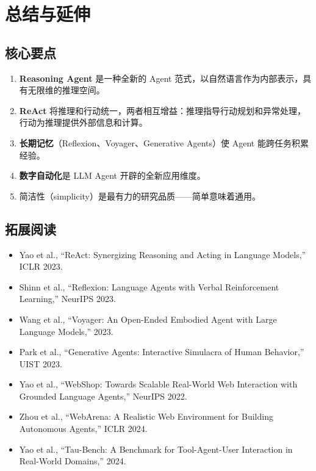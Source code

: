\section{总结与延伸}

\subsection{核心要点}

\begin{enumerate}
    \item \textbf{Reasoning Agent} 是一种全新的 Agent 范式，以自然语言作为内部表示，具有无限维的推理空间。
    \item \textbf{ReAct} 将推理和行动统一，两者相互增益：推理指导行动规划和异常处理，行动为推理提供外部信息和计算。
    \item \textbf{长期记忆}（Reflexion、Voyager、Generative Agents）使 Agent 能跨任务积累经验。
    \item \textbf{数字自动化}是 LLM Agent 开辟的全新应用维度。
    \item 简洁性（simplicity）是最有力的研究品质——简单意味着通用。
\end{enumerate}

\subsection{拓展阅读}

\begin{itemize}
    \item Yao et al., ``ReAct: Synergizing Reasoning and Acting in Language Models,'' ICLR 2023.
    \item Shinn et al., ``Reflexion: Language Agents with Verbal Reinforcement Learning,'' NeurIPS 2023.
    \item Wang et al., ``Voyager: An Open-Ended Embodied Agent with Large Language Models,'' 2023.
    \item Park et al., ``Generative Agents: Interactive Simulacra of Human Behavior,'' UIST 2023.
    \item Yao et al., ``WebShop: Towards Scalable Real-World Web Interaction with Grounded Language Agents,'' NeurIPS 2022.
    \item Zhou et al., ``WebArena: A Realistic Web Environment for Building Autonomous Agents,'' ICLR 2024.
    \item Yao et al., ``Tau-Bench: A Benchmark for Tool-Agent-User Interaction in Real-World Domains,'' 2024.
\end{itemize}



